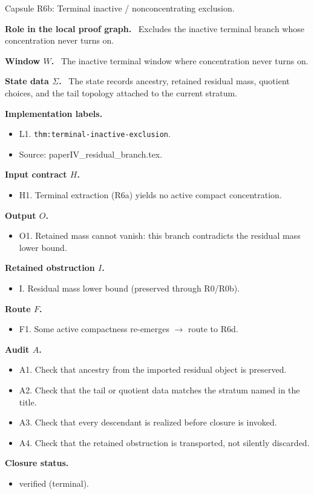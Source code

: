 \documentclass[11pt]{amsart}
\newcommand{\capsulefield}[1]{\par\smallskip\noindent\textbf{#1.}\ }
\begin{document}
\begin{proofcapsule}{Capsule R6b: Terminal inactive / nonconcentrating exclusion.}
  \capsulefield{Role in the local proof graph}
  Excludes the inactive terminal branch whose concentration never turns on.

  \capsulefield{Window \(W\)}
The inactive terminal window where concentration never turns on.

  \capsulefield{State data \(\Sigma\)}
The state records ancestry, retained residual mass, quotient choices, and the tail topology attached to the current stratum.

  \capsulefield{Implementation labels}
  \begin{itemize}[leftmargin=1.8em]
  \item L1. \texttt{thm:terminal-inactive-exclusion}.
  \item Source: paperIV\_residual\_branch.tex.
  \end{itemize}

  \capsulefield{Input contract \(H\)}
  \begin{itemize}[leftmargin=1.8em]
  \item H1. Terminal extraction (R6a) yields no active compact concentration.
  \end{itemize}

  \capsulefield{Output \(O\)}
  \begin{itemize}[leftmargin=1.8em]
  \item O1. Retained mass cannot vanish: this branch contradicts the residual mass lower bound.
  \end{itemize}

  \capsulefield{Retained obstruction \(I\)}
  \begin{itemize}[leftmargin=1.8em]
  \item I. Residual mass lower bound (preserved through R0/R0b).
  \end{itemize}

  \capsulefield{Route \(F\)}
  \begin{itemize}[leftmargin=1.8em]
  \item F1. Some active compactness re-emerges $\to$ route to R6d.
  \end{itemize}

  \capsulefield{Audit \(A\)}
  \begin{itemize}[leftmargin=1.8em]
  \item A1. Check that ancestry from the imported residual object is preserved.
  \item A2. Check that the tail or quotient data matches the stratum named in the title.
  \item A3. Check that every descendant is realized before closure is invoked.
  \item A4. Check that the retained obstruction is transported, not silently discarded.
  \end{itemize}
  \capsulefield{Closure status}
  \begin{itemize}[leftmargin=1.8em]
  \item verified (terminal).
  \end{itemize}
\end{proofcapsule}
\end{document}

